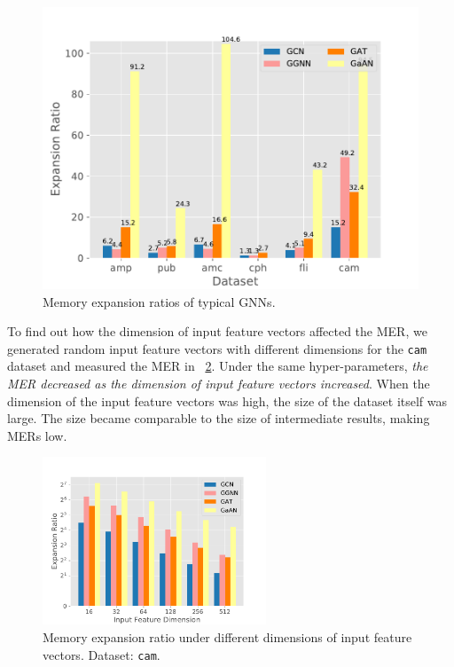 \begin{figure}[H]
    \centering
    \includegraphics[width=0.5\columnwidth]{figs/experiments/exp_memory_expansion_ratio.pdf}
    \caption{Memory expansion ratios of typical GNNs.}
    \label{fig:exp_memory_expansion_ratio}
\end{figure}

To find out how the dimension of input feature vectors affected the MER, we generated random input feature vectors with different dimensions for the \texttt{cam} dataset and measured the MER in \figurename~\ref{fig:exp_memory_expension_ratio_input_feature_dimension}.
%
Under the same hyper-parameters, \emph{the MER decreased as the dimension of input feature vectors increased}.
%
When the dimension of the input feature vectors was high, the size of the dataset itself was large.
%
The size became comparable to the size of intermediate results, making MERs low.


\begin{figure}[H]
    \centering
    \includegraphics[height=5cm]{figs/experiments/exp_memory_expansion_ratio_input_feature_dimension_com-amazon.pdf}
    \caption{Memory expansion ratio under different dimensions of input feature vectors. Dataset: \texttt{cam}.}
    \label{fig:exp_memory_expension_ratio_input_feature_dimension}
\end{figure}

